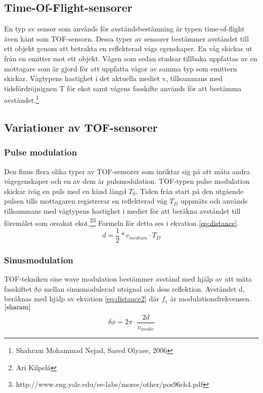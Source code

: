 \documentclass[a4paper,12pt,fleqn]{article}
\begin{document}
\subsection{Time-Of-Flight-sensorer}
En typ av sensor som används för avståndsbestämning är typen time-of-flight även känt som TOF-sensorn. Dessa typer av sensorer bestämmer avståndet till ett objekt genom att betrakta en reflekterad vågs egenskaper. 
En våg skickas ut från en emitter mot ett objekt. Vågen som sedan studsar tillbaka uppfattas av en mottagare som är gjord för att uppfatta vågor av samma typ som emittern skickar. Vågtypens hastighet i det aktuella mediet v, tillsammans med tidsfördröjnignen T för ekot samt vågens fasskifte används för att bestämma avståndet.\footnote{\label{sharam}Shahram Mohammad Nejad, Saeed Olyaee, 2006}



\subsection{Variationer av TOF-sensorer}

\subsubsection{Pulse modulation}
Den finns flera olika typer av TOF-sensorer som inriktar sig på att mäta andra vågegenskaper och en av dem är pulsmodulation.
TOF-typen pulse modulation skickar iväg en puls med en känd längd \begin{math}T_{0}\end{math}. Tiden från start på den utgående pulsen tills mottagaren registrerar en reflekterad våg \begin{math}T_{D}\end{math} uppmäts och används tillsammans med vågtypens hastighet i mediet för att beräkna avståndet till föremålet som orsakat ekot.\footnote{Ari Kilpelä}\footnote{http://www.eng.yale.edu/ee-labs/morse/other/pos96ch4.pdf} Formeln för detta ses i ekvation \ref{eq:distance}.
\begin{equation}
\label{eq:distance}
d = \frac{1}{2}*v_{medium} \cdot T_D
\end{equation}

\subsubsection{Sinusmodulation}
TOF-tekniken sine wave modulation bestämmer avstånd med hjälp av att mäta fasskiftet \begin{math}\delta\phi\end{math} mellan sinusmodulerad utsignal och dess reflektion. Avståndet d, beräknas med hjälp av ekvation \ref{eq:distance2} där \begin{math}f_1\end{math} är modulationsfrekvensen. $^{\ref{sharam}}$
\begin{equation}
\label{eq:distance2}
\delta\phi = 2\pi \cdot \frac{2d}{v_{medie}}
\end{equation}
\end{document}
